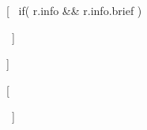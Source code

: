 [~ if( r.info && r.info.brief ) { ~]


\begin{cvparagraph}
[[ r.info.brief ]]
\end{cvparagraph}
[~ } ~]
